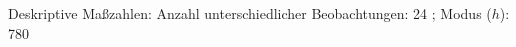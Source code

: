 				\label{tableValues:bvoc05b_g1}
				\vspace*{-\baselineskip}
                    \begin{noten}
                	    \note{} Deskriptive Maßzahlen:
                	    Anzahl unterschiedlicher Beobachtungen: 24%
                	    ; 
                	      Modus ($h$): 780
                     \end{noten}


